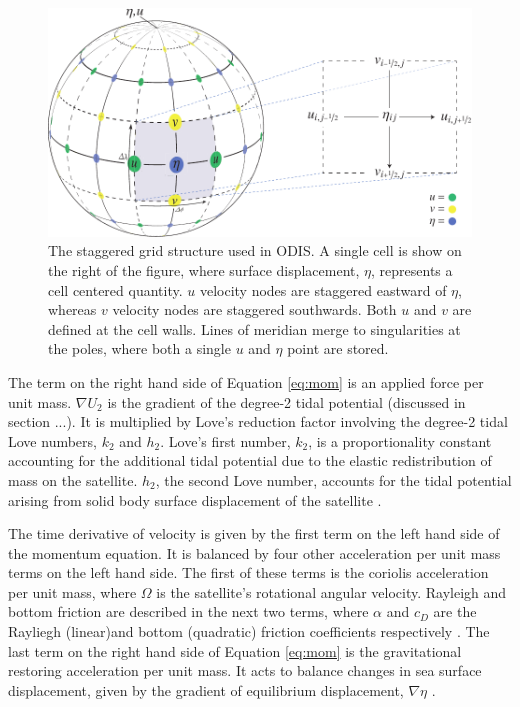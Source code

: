 \begin{figure}[t]
\centering
\includegraphics[width=0.8\linewidth]{Figures/GridDiagram}
\caption{The staggered grid structure used in ODIS. A single cell is show on the right of the figure, where surface displacement, $\eta$, represents a cell centered quantity. $u$ velocity nodes are staggered eastward of $\eta$, whereas $v$ velocity nodes are staggered southwards. Both $u$ and $v$ are defined at the cell walls. Lines of meridian merge to singularities at the poles, where both a single $u$ and $\eta$ point are stored.\label{fig:grid}}
\end{figure}

The term on the right hand side of Equation \ref{eq:mom} is an applied force per unit mass. $\nabla U_2$ is the gradient of the degree-2 tidal potential (discussed in section ...). It is multiplied by Love's reduction factor involving the degree-2 tidal Love numbers, $k_2$ and $h_2$. Love's first number, $k_2$, is a proportionality constant accounting for the additional tidal potential due to the elastic redistribution of mass on the satellite. $h_2$, the second Love number, accounts for the tidal potential arising from solid body surface displacement of the satellite \citep{love1911some}.

The time derivative of velocity is given by the first term on the left hand side of the momentum equation. It is balanced by four other acceleration per unit mass terms on the left hand side. The first of these terms is the coriolis acceleration per unit mass, where $\Omega$ is the satellite's rotational angular velocity. Rayleigh and bottom friction are described in the next two terms, where $\alpha$ and $c_D$ are the Rayliegh (linear)and bottom (quadratic) friction coefficients respectively \citep{sears1995tidal,chen2013tidal}. The last term on the right hand side of Equation \ref{eq:mom} is the gravitational restoring acceleration per unit mass. It acts to balance changes in sea surface displacement, given by the gradient of equilibrium displacement, $\nabla \eta$ .

